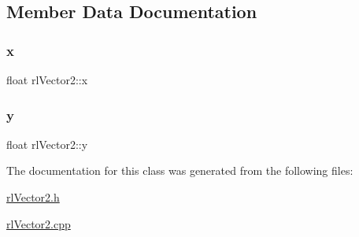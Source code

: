 \subsection{Member Data Documentation}
\mbox{\label{classrl_vector2_aaa61c10d3c6f5f5822b110290bea14de}} 
\subsubsection{\texorpdfstring{x}{x}}
{\footnotesize\ttfamily float rl\+Vector2\+::x\hspace{0.3cm}{\ttfamily [private]}}

\mbox{\label{classrl_vector2_a67f900eef0c9312627966b51dc72571b}} 
\subsubsection{\texorpdfstring{y}{y}}
{\footnotesize\ttfamily float rl\+Vector2\+::y\hspace{0.3cm}{\ttfamily [private]}}



The documentation for this class was generated from the following files\+:\begin{DoxyCompactItemize}
\item 
\hyperlink{rl_vector2_8h}{rl\+Vector2.\+h}\item 
\hyperlink{rl_vector2_8cpp}{rl\+Vector2.\+cpp}\end{DoxyCompactItemize}
